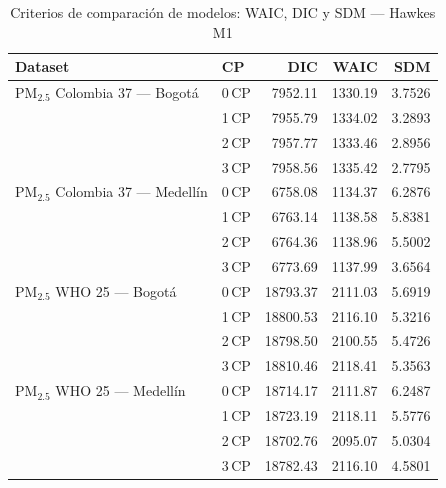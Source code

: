 \begin{table}[htbp]
\centering
\caption{Criterios de comparaci\'{o}n de modelos: WAIC, DIC y SDM --- Hawkes M1}
\label{tab:hawkes_criterios}
\begin{tabular}{llrrr}
\toprule
Dataset & CP & DIC & WAIC & SDM \\
\midrule
PM$_{2.5}$ Colombia 37 --- Bogot\'{a} & 0\,CP & 7952.11 & 1330.19 & 3.7526 \\
 & 1\,CP & 7955.79 & 1334.02 & 3.2893 \\
 & 2\,CP & 7957.77 & 1333.46 & 2.8956 \\
 & 3\,CP & 7958.56 & 1335.42 & 2.7795 \\
\midrule
PM$_{2.5}$ Colombia 37 --- Medell\'{i}n & 0\,CP & 6758.08 & 1134.37 & 6.2876 \\
 & 1\,CP & 6763.14 & 1138.58 & 5.8381 \\
 & 2\,CP & 6764.36 & 1138.96 & 5.5002 \\
 & 3\,CP & 6773.69 & 1137.99 & 3.6564 \\
\midrule
PM$_{2.5}$ WHO 25 --- Bogot\'{a} & 0\,CP & 18793.37 & 2111.03 & 5.6919 \\
 & 1\,CP & 18800.53 & 2116.10 & 5.3216 \\
 & 2\,CP & 18798.50 & 2100.55 & 5.4726 \\
 & 3\,CP & 18810.46 & 2118.41 & 5.3563 \\
\midrule
PM$_{2.5}$ WHO 25 --- Medell\'{i}n & 0\,CP & 18714.17 & 2111.87 & 6.2487 \\
 & 1\,CP & 18723.19 & 2118.11 & 5.5776 \\
 & 2\,CP & 18702.76 & 2095.07 & 5.0304 \\
 & 3\,CP & 18782.43 & 2116.10 & 4.5801 \\
\bottomrule
\end{tabular}
\end{table}
